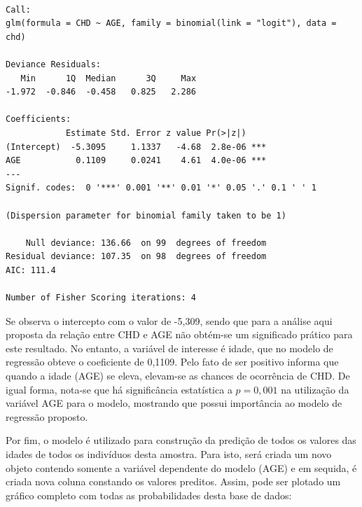 \documentclass[12pt,brazil,oneside]{book}
\newenvironment{Shaded}{\begin{snugshade}}{\end{snugshade}}
\newcommand{\CommentTok}[1]{\textcolor[rgb]{0.56,0.35,0.01}{\textit{#1}}}
\newcommand{\DataTypeTok}[1]{\textcolor[rgb]{0.13,0.29,0.53}{#1}}
\newcommand{\DecValTok}[1]{\textcolor[rgb]{0.00,0.00,0.81}{#1}}
\newcommand{\KeywordTok}[1]{\textcolor[rgb]{0.13,0.29,0.53}{\textbf{#1}}}
\newcommand{\NormalTok}[1]{#1}
\newcommand{\OperatorTok}[1]{\textcolor[rgb]{0.81,0.36,0.00}{\textbf{#1}}}
\newcommand{\StringTok}[1]{\textcolor[rgb]{0.31,0.60,0.02}{#1}}
\begin{document}
\begin{verbatim}

Call:
glm(formula = CHD ~ AGE, family = binomial(link = "logit"), data = chd)

Deviance Residuals: 
   Min      1Q  Median      3Q     Max  
-1.972  -0.846  -0.458   0.825   2.286  

Coefficients:
            Estimate Std. Error z value Pr(>|z|)    
(Intercept)  -5.3095     1.1337   -4.68  2.8e-06 ***
AGE           0.1109     0.0241    4.61  4.0e-06 ***
---
Signif. codes:  0 '***' 0.001 '**' 0.01 '*' 0.05 '.' 0.1 ' ' 1

(Dispersion parameter for binomial family taken to be 1)

    Null deviance: 136.66  on 99  degrees of freedom
Residual deviance: 107.35  on 98  degrees of freedom
AIC: 111.4

Number of Fisher Scoring iterations: 4
\end{verbatim}

Se observa o intercepto com o valor de -5,309, sendo que para a análise
aqui proposta da relação entre CHD e AGE não obtém-se um significado
prático para este resultado. No entanto, a variável de interesse é
idade, que no modelo de regressão obteve o coeficiente de 0,1109. Pelo
fato de ser positivo informa que quando a idade (AGE) se eleva,
elevam-se as chances de ocorrência de CHD. De igual forma, nota-se que
há significância estatística a \(p=0,001\) na utilização da variável AGE
para o modelo, mostrando que possui importância ao modelo de regressão
proposto.

Por fim, o modelo é utilizado para construção da predição de todos os
valores das idades de todos os indivíduos desta amostra. Para isto, será
criada um novo objeto contendo somente a variável dependente do modelo
(AGE) e em sequida, é criada nova coluna constando os valores preditos.
Assim, pode ser plotado um gráfico completo com todas as probabilidades
desta base de dados:

\begin{Shaded}
\end{Shaded}
\end{document}
